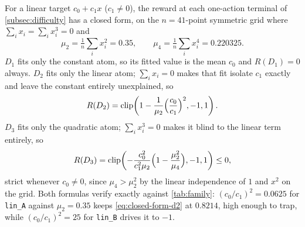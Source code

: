 \documentclass[11pt, a4paper]{article}
\theoremstyle{definition}
\begin{document}
For a linear target \(c_0+c_1x\) (\(c_1\neq0\)), the reward at each
one-action terminal of \cref{subsec:difficulty} has a closed form, on the
\(n=41\)-point symmetric grid where \(\sum_ix_i=\sum_ix_i^3=0\) and
\[
    \mu_2=\tfrac1n\sum_ix_i^2=0.35,
    \qquad
    \mu_4=\tfrac1n\sum_ix_i^4=0.220325.
\]
\(D_1\) fits only the constant atom, so its fitted value is the mean \(c_0\)
and \(R(D_1)=0\) always.  \(D_2\) fits only the linear atom; \(\sum_ix_i=0\)
makes that fit isolate \(c_1\) exactly and leave the constant entirely
unexplained, so
\begin{equation}
    R(D_2)=\operatorname{clip}\!\left(1-\frac1{\mu_2}\Bigl(\frac{c_0}{c_1}\Bigr)^{2},-1,1\right).
    \label{eq:closed-form-d2}
\end{equation}
\(D_3\) fits only the quadratic atom; \(\sum_ix_i^3=0\) makes it blind to the
linear term entirely, so
\begin{equation}
    R(D_3)=\operatorname{clip}\!\left(-\frac{c_0^2}{c_1^2\mu_2}\Bigl(1-\frac{\mu_2^2}{\mu_4}\Bigr),-1,1\right)\le0,
    \label{eq:closed-form-d3}
\end{equation}
strict whenever \(c_0\neq0\), since \(\mu_4>\mu_2^2\) by the linear
independence of \(1\) and \(x^2\) on the grid.  Both formulas verify exactly
against \cref{tab:family}: \((c_0/c_1)^2=0.0625\) for \texttt{lin\_A} against
\(\mu_2=0.35\) keeps \eqref{eq:closed-form-d2} at \(0.8214\), high enough to
trap, while \((c_0/c_1)^2=25\) for \texttt{lin\_B} drives it to \(-1\).



\end{document}
